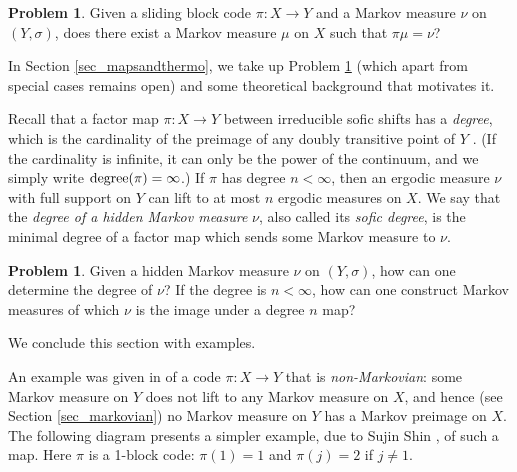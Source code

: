 \documentclass{kepart2010}
\theoremstyle{plain}
\theoremstyle{definition}
\newtheorem{prob}[thm]{Problem}
\theoremstyle{remark}
\theoremstyle{definition}
\numberwithin{equation}{section}
\begin{document}
\begin{prob}\label{prob_lift}
Given a sliding block code $\pi:X \to Y$
and a Markov measure $\nu$ on $(Y,\sigma)$, does there exist a
Markov
measure $\mu$ on $X$ such that $\pi\mu = \nu$?
\end{prob}

In Section \ref{sec_mapsandthermo},
we take up Problem \ref{prob_lift} (which apart from special
cases remains open)
and some theoretical background that motivates
it.

Recall that a factor map
$\pi : X\to Y$
between irreducible sofic shifts
has a {\it degree}, which is the cardinality
of the preimage of any doubly transitive point of $Y$
 \cite{LindMarcus1995}. (If the cardinality is infinite,
it can only be the power of the continuum, and we simply
write $\textnormal{degree}(\pi )=\infty$.)
 If $\pi$
has degree $n<\infty$, then an ergodic measure $\nu$ with full
support on $Y$ can lift to  at most $n$  ergodic measures on $X$. We
say that the {\it degree of a hidden Markov measure} $\nu$, also
called its {\em sofic degree}, is the minimal degree of a factor map
which sends some Markov measure to $\nu$.

\begin{prob}\label{prob_soficdegree}
Given a hidden Markov measure $\nu$ on $(Y,\sigma)$, how can one
determine the degree of $\nu$? If the degree is $n< \infty$, how can
one construct Markov measures of which
$\nu$ is the image under a degree $n$ map?
\end{prob}

We conclude this section with  examples.

\begin{ex}\label{figshinnonmarkovian}

An example was given in \cite{MarcusPetersenWilliams1984}
 of a code $\pi : X \to Y$ that is {\em non-Markovian}: some Markov measure
 on $Y$ does not lift
 to any Markov measure on $X$, and hence (see Section \ref{sec_markovian})
 no Markov measure on $Y$ has a Markov preimage on $X$. The following diagram
 presents a simpler example, due to Sujin Shin \cite{Shin2001-2,Shin2006},
  of such a map. Here $\pi$ is a 1-block code: $\pi (1)=1$ and $\pi
 (j)=2$ if $j\neq 1$.

\begin{center}
\end{center}
\end{ex}
\end{document}
